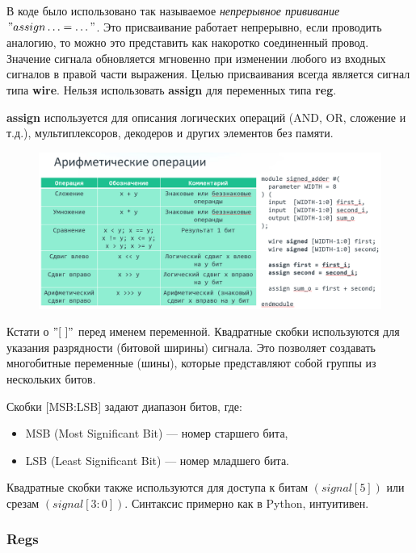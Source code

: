 \documentclass[a4paper,12pt]{article} %
\begin{document}
В коде было использовано так называемое \textit{непрерывное прививание} $"assign \dotsc = \dotsc "$. Это присваивание работает непрерывно, если проводить аналогию, то можно это представить как накоротко соединенный провод. Значение сигнала обновляется мгновенно при изменении любого из входных сигналов в правой части выражения. Целью присваивания всегда является сигнал типа \textbf{wire}. Нельзя использовать \textbf{assign} для переменных типа \textbf{reg}. 

\textbf{assign} используется для описания логических операций (AND, OR, сложение и т.д.), мультиплексоров, декодеров и других элементов без памяти.

\begin{figure}[H]
    \centering
    \includegraphics[width=1\linewidth]{Learning/table.png}
\end{figure}

Кстати о $"\text{[ ]}"$ перед именем переменной. Квадратные скобки используются для указания разрядности (битовой ширины) сигнала. Это позволяет создавать многобитные переменные (шины), которые представляют собой группы из нескольких битов.

Скобки [MSB:LSB] задают диапазон битов, где:
\begin{itemize}
    \item MSB (Most Significant Bit) — номер старшего бита,
    \item LSB (Least Significant Bit) — номер младшего бита.
\end{itemize}

Квадратные скобки также используются для доступа к битам $(signal[5])$ или срезам $(signal[3:0])$. Синтаксис примерно как в Python, интуитивен.

\subsubsection{Regs}
\end{document}
